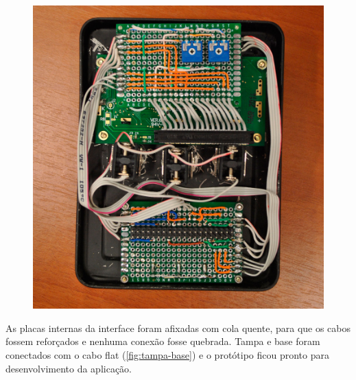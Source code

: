 \documentclass[
		12pt,				%
		openright,			%
		oneside,			%
		a4paper,			%
		chapter=TITLE,		%
		english,			%
		brazil				%
	]{abntex2}
\begin{document}
\begin{figure}[htb]
\begin{minipage}{0.45\textwidth}
		\includegraphics[width=1\textwidth]{img/interface-traz2.jpg}
	\end{minipage}
\end{figure}

As placas internas da interface foram afixadas com cola quente, para que os cabos fossem reforçados e nenhuma conexão fosse quebrada. Tampa e base foram conectados com o cabo flat (\autoref{fig:tampa-base}) e o protótipo ficou pronto para desenvolvimento da aplicação.
\end{document}
